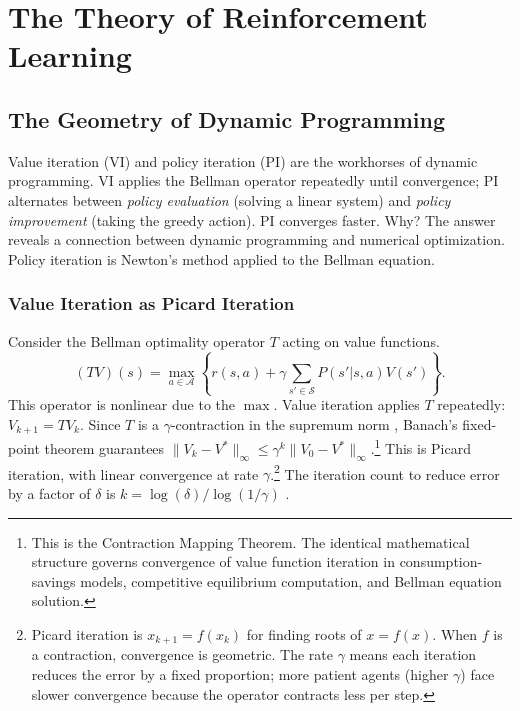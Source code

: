 
\section{The Theory of Reinforcement Learning}
\label{sec:planning_learning}

\subsection{The Geometry of Dynamic Programming}
\label{sec:newton_connection}

Value iteration (VI) and policy iteration (PI) are the workhorses of dynamic programming. VI applies the Bellman operator repeatedly until convergence; PI alternates between \emph{policy evaluation} (solving a linear system) and \emph{policy improvement} (taking the greedy action). PI converges faster. Why? The answer reveals a connection between dynamic programming and numerical optimization. Policy iteration is Newton's method applied to the Bellman equation.

\subsubsection{Value Iteration as Picard Iteration}

Consider the Bellman optimality operator $T$ acting on value functions.
\begin{equation}
(TV)(s) = \max_{a \in \mathcal{A}} \left\{ r(s,a) + \gamma \sum_{s' \in \mathcal{S}} P(s'|s,a) V(s') \right\}.
\label{eq:bellman_operator}
\end{equation}
This operator is nonlinear due to the $\max$. Value iteration applies $T$ repeatedly: $V_{k+1} = TV_k$. Since $T$ is a $\gamma$-contraction in the supremum norm \citep{denardo1967}, Banach's fixed-point theorem guarantees $\|V_k - V^*\|_\infty \leq \gamma^k \|V_0 - V^*\|_\infty$.\footnote{This is the Contraction Mapping Theorem. The identical mathematical structure governs convergence of value function iteration in consumption-savings models, competitive equilibrium computation, and Bellman equation solution.} This is Picard iteration, with linear convergence at rate $\gamma$.\footnote{Picard iteration is $x_{k+1} = f(x_k)$ for finding roots of $x = f(x)$. When $f$ is a contraction, convergence is geometric. The rate $\gamma$ means each iteration reduces the error by a fixed proportion; more patient agents (higher $\gamma$) face slower convergence because the operator contracts less per step.} The iteration count to reduce error by a factor of $\delta$ is $k = \log(\delta) / \log(1/\gamma)$ \citep{bertsekas1996}.

